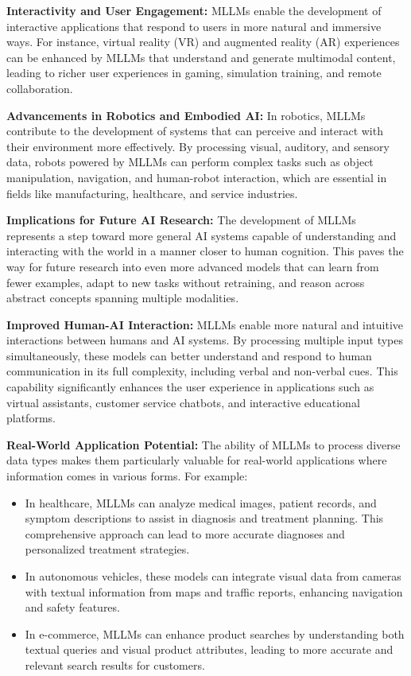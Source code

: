 \textbf{Interactivity and User Engagement:} MLLMs enable the development of interactive applications that respond to users in more natural and immersive ways. For instance, virtual reality (VR) and augmented reality (AR) experiences can be enhanced by MLLMs that understand and generate multimodal content, leading to richer user experiences in gaming, simulation training, and remote collaboration.

\textbf{Advancements in Robotics and Embodied AI:} In robotics, MLLMs contribute to the development of systems that can perceive and interact with their environment more effectively. By processing visual, auditory, and sensory data, robots powered by MLLMs can perform complex tasks such as object manipulation, navigation, and human-robot interaction, which are essential in fields like manufacturing, healthcare, and service industries.

\textbf{Implications for Future AI Research:} The development of MLLMs represents a step toward more general AI systems capable of understanding and interacting with the world in a manner closer to human cognition. This paves the way for future research into even more advanced models that can learn from fewer examples, adapt to new tasks without retraining, and reason across abstract concepts spanning multiple modalities.

\textbf{Improved Human-AI Interaction:} MLLMs enable more natural and intuitive interactions between humans and AI systems. By processing multiple input types simultaneously, these models can better understand and respond to human communication in its full complexity, including verbal and non-verbal cues. This capability significantly enhances the user experience in applications such as virtual assistants, customer service chatbots, and interactive educational platforms.

\textbf{Real-World Application Potential:} The ability of MLLMs to process diverse data types makes them particularly valuable for real-world applications where information comes in various forms. For example:
\begin{itemize}
\item In healthcare, MLLMs can analyze medical images, patient records, and symptom descriptions to assist in diagnosis and treatment planning. This comprehensive approach can lead to more accurate diagnoses and personalized treatment strategies.
\item In autonomous vehicles, these models can integrate visual data from cameras with textual information from maps and traffic reports, enhancing navigation and safety features.
\item In e-commerce, MLLMs can enhance product searches by understanding both textual queries and visual product attributes, leading to more accurate and relevant search results for customers.
\end{itemize}

